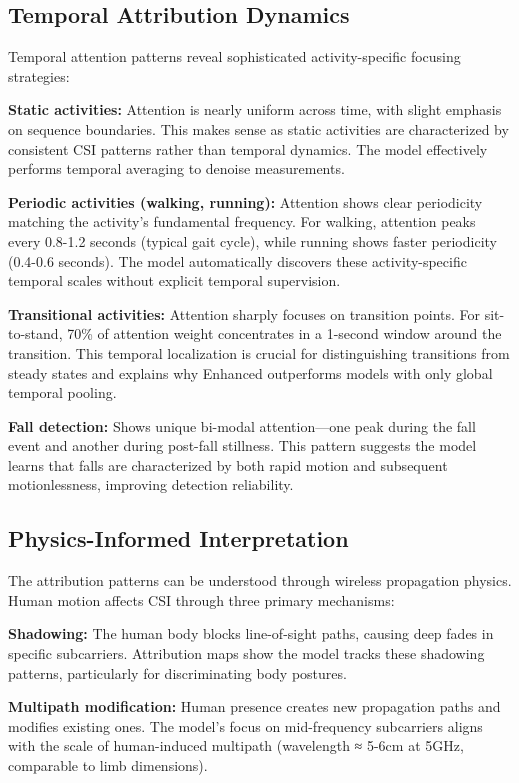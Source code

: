 \documentclass[journal]{IEEEtran}
\begin{document}
\subsection{Temporal Attribution Dynamics}
Temporal attention patterns reveal sophisticated activity-specific focusing strategies:

\textbf{Static activities:} Attention is nearly uniform across time, with slight emphasis on sequence boundaries. This makes sense as static activities are characterized by consistent CSI patterns rather than temporal dynamics. The model effectively performs temporal averaging to denoise measurements.

\textbf{Periodic activities (walking, running):} Attention shows clear periodicity matching the activity's fundamental frequency. For walking, attention peaks every 0.8-1.2 seconds (typical gait cycle), while running shows faster periodicity (0.4-0.6 seconds). The model automatically discovers these activity-specific temporal scales without explicit temporal supervision.

\textbf{Transitional activities:} Attention sharply focuses on transition points. For sit-to-stand, 70\% of attention weight concentrates in a 1-second window around the transition. This temporal localization is crucial for distinguishing transitions from steady states and explains why Enhanced outperforms models with only global temporal pooling.

\textbf{Fall detection:} Shows unique bi-modal attention—one peak during the fall event and another during post-fall stillness. This pattern suggests the model learns that falls are characterized by both rapid motion and subsequent motionlessness, improving detection reliability.

\subsection{Physics-Informed Interpretation}
The attribution patterns can be understood through wireless propagation physics. Human motion affects CSI through three primary mechanisms:

\textbf{Shadowing:} The human body blocks line-of-sight paths, causing deep fades in specific subcarriers. Attribution maps show the model tracks these shadowing patterns, particularly for discriminating body postures.

\textbf{Multipath modification:} Human presence creates new propagation paths and modifies existing ones. The model's focus on mid-frequency subcarriers aligns with the scale of human-induced multipath (wavelength ≈ 5-6cm at 5GHz, comparable to limb dimensions).
\end{document}
